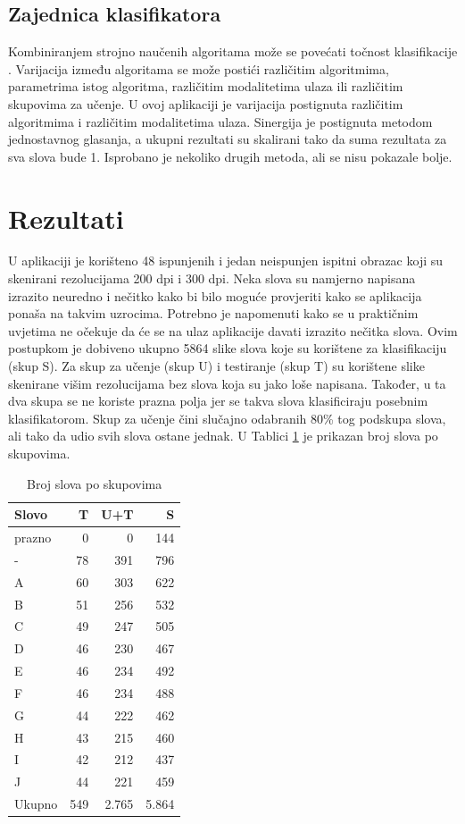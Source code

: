 \documentclass[a4paper,twocolumn,dvipdfm]{article}
\begin{document}
\subsection{Zajednica klasifikatora}
Kombiniranjem strojno naučenih algoritama može se povećati točnost
klasifikacije \cite{alpaydin2004introduction}. Varijacija između algoritama se
može postići različitim algoritmima, parametrima istog algoritma, različitim
modalitetima ulaza ili različitim skupovima za učenje. U ovoj aplikaciji je
varijacija postignuta različitim algoritmima i različitim modalitetima ulaza.
Sinergija je postignuta metodom jednostavnog glasanja, a ukupni rezultati su
skalirani tako da suma rezultata za sva slova bude 1. Isprobano je nekoliko
drugih metoda, ali se nisu pokazale bolje.

\section{Rezultati}
U aplikaciji je korišteno 48 ispunjenih i jedan neispunjen ispitni obrazac koji
su skenirani rezolucijama 200 dpi i 300 dpi. Neka slova su namjerno napisana
izrazito neuredno i nečitko kako bi bilo moguće provjeriti kako se aplikacija
ponaša na takvim uzrocima. Potrebno je napomenuti kako se u praktičnim uvjetima
ne očekuje da će se na ulaz aplikacije davati izrazito nečitka slova. Ovim
postupkom je dobiveno ukupno 5864 slike slova koje su korištene za klasifikaciju
(skup S). Za skup za učenje (skup U) i testiranje (skup T) su korištene slike
skenirane višim rezolucijama bez slova koja su jako loše napisana. Također,
u ta dva skupa se ne koriste prazna polja jer se takva slova klasificiraju
posebnim klasifikatorom. Skup za učenje čini slučajno odabranih 80\% tog
podskupa slova, ali tako da udio svih slova ostane jednak. U Tablici
\ref{table:brojSlova} je prikazan broj slova po skupovima.

\begin{table}[htb]
\centering
\begin{tabular}{lrrr} \toprule
Slovo & T & U+T & S \\ \midrule
prazno & 0 & 0 & 144 \\
- & 78 & 391 & 796 \\
A & 60 & 303 & 622 \\
B & 51 & 256 & 532 \\
C & 49 & 247 & 505 \\
D & 46 & 230 & 467 \\
E & 46 & 234 & 492 \\
F & 46 & 234 & 488 \\
G & 44 & 222 & 462 \\
H & 43 & 215 & 460 \\
I & 42 & 212 & 437 \\
J & 44 & 221 & 459 \\ \midrule
Ukupno & 549 & 2.765 & 5.864 \\ \bottomrule
\end{tabular}
\caption{Broj slova po skupovima}
\label{table:brojSlova}
\end{table}
\end{document}
